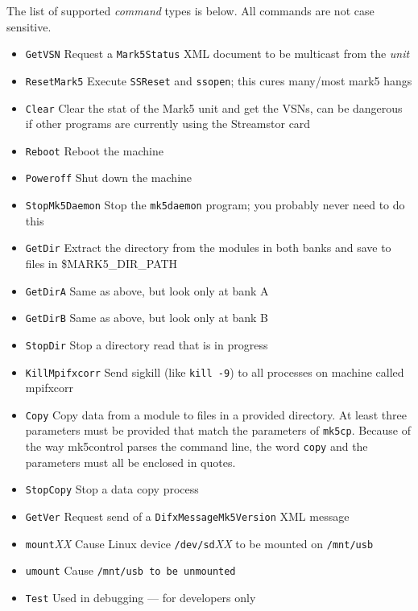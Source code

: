 The list of supported {\em command} types is below.
All commands are not case sensitive.
\begin{itemize}
\item {\tt GetVSN} Request a {\tt Mark5Status} XML document to be multicast from the {\em unit}
\item {\tt ResetMark5} Execute {\tt SSReset} and {\tt ssopen}; this cures many/most mark5 hangs
\item {\tt Clear} Clear the stat of the Mark5 unit and get the VSNs, can be dangerous if other programs are currently using the Streamstor card
\item {\tt Reboot} Reboot the machine
\item {\tt Poweroff} Shut down the machine
\item {\tt StopMk5Daemon} Stop the {\tt mk5daemon} program; you probably never need to do this
\item {\tt GetDir} Extract the directory from the modules in both banks and save to files in \$MARK5\_DIR\_PATH
\item {\tt GetDirA} Same as above, but look only at bank A
\item {\tt GetDirB} Same as above, but look only at bank B
\item {\tt StopDir} Stop a directory read that is in progress
\item {\tt KillMpifxcorr} Send sigkill (like {\tt kill -9}) to all processes on machine called mpifxcorr
\item {\tt Copy} Copy data from a module to files in a provided directory.
At least three parameters must be provided that match the parameters of {\tt mk5cp}.
Because of the way mk5control parses the command line, the word {\tt copy} and the parameters must all be enclosed in quotes.
\item {\tt StopCopy} Stop a data copy process
\item {\tt GetVer} Request send of a {\tt DifxMessageMk5Version} XML message
\item {\tt mount}{\em XX} Cause Linux device {\tt /dev/sd}{\em XX} to be mounted on {\tt /mnt/usb}
\item {\tt umount} Cause {\tt /mnt/usb to be unmounted}
\item {\tt Test} Used in debugging --- for developers only
\end{itemize}







